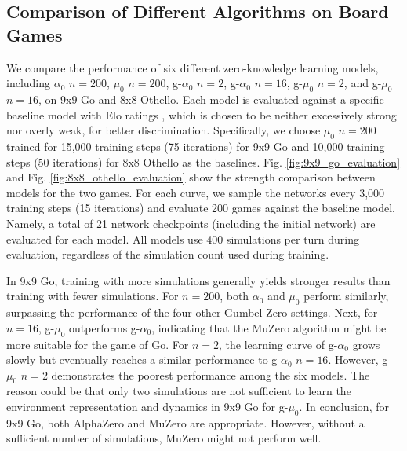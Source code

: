 \subsection{Comparison of Different Algorithms on Board Games}\label{exp:board}
We compare the performance of six different zero-knowledge learning models, including $\alpha_0$ $n=200$, $\mu_0$ $n=200$, g-$\alpha_0$ $n=2$, g-$\alpha_0$ $n=16$, g-$\mu_0$ $n=2$, and g-$\mu_0$ $n=16$, on 9x9 Go and 8x8 Othello.
Each model is evaluated against a specific baseline model with Elo ratings \cite{silver_general_2018}, which is chosen to be neither excessively strong nor overly weak, for better discrimination.
Specifically, we choose $\mu_0$ $n=200$ trained for 15,000 training steps (75 iterations) for 9x9 Go and 10,000 training steps (50 iterations) for 8x8 Othello as the baselines.
Fig. \ref{fig:9x9_go_evaluation} and Fig. \ref{fig:8x8_othello_evaluation} show the strength comparison between models for the two games.
For each curve, we sample the networks every 3,000 training steps (15 iterations) and evaluate 200 games against the baseline model.
Namely, a total of 21 network checkpoints (including the initial network) are evaluated for each model.
All models use 400 simulations per turn during evaluation, regardless of the simulation count used during training.

In 9x9 Go, training with more simulations generally yields stronger results than training with fewer simulations.
For $n=200$, both $\alpha_0$ and $\mu_0$ perform similarly, surpassing the performance of the four other Gumbel Zero settings.
Next, for $n=16$, g-$\mu_0$ outperforms g-$\alpha_0$, indicating that the MuZero algorithm might be more suitable for the game of Go.
For $n=2$, the learning curve of g-$\alpha_0$ grows slowly but eventually reaches a similar performance to g-$\alpha_0$ $n=16$.
However, g-$\mu_0$ $n=2$ demonstrates the poorest performance among the six models.
The reason could be that only two simulations are not sufficient to learn the environment representation and dynamics in 9x9 Go for g-$\mu_0$.
In conclusion, for 9x9 Go, both AlphaZero and MuZero are appropriate.
However, without a sufficient number of simulations, MuZero might not perform well.


